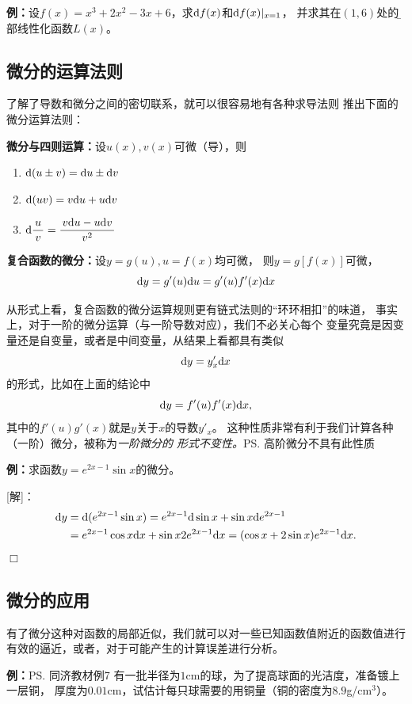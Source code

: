{\bf 例：}设$f(x)=x^3+2x^2-3x+6$，求$\mathrm{d} f(x)$和$\mathrm{d} f(x)|_{x=1}$，
并求其在$(1,6)$处的{\b 局部线性化函数$L(x)$}。

\subsection{微分的运算法则}

了解了导数和微分之间的密切联系，就可以很容易地有各种求导法则
推出下面的微分运算法则：

\begin{thx}
	{\bf 微分与四则运算：}设$u(x),v(x)$可微（导），则
	\begin{enumerate}[(1)]
	  \setlength{\itemindent}{1cm}
	  \item $\mathrm{d} (u\pm v)=\mathrm{d} u\pm \mathrm{d} v$
	  \item $\mathrm{d}(uv)=v\mathrm{d} u+u\mathrm{d} v$
	  \item $\mathrm{d}\displaystyle\frac{\,{u}\,}{\,{v}\,}=\displaystyle\frac{\,{v\mathrm{d} u-u\mathrm{d} v}\,}{\,{v^2}\,}$
	\end{enumerate}
	
	{\bf 复合函数的微分：}设$y=g(u),u=f(x)$均可微，
	则$y=g[f(x)]$可微，
	$$\mathrm{d} y=g'(u)\mathrm{d} u=g'(u)f'(x)\mathrm{d} x$$		
\end{thx}

从形式上看，复合函数的微分运算规则更有链式法则的“环环相扣”的味道，
事实上，对于一阶的微分运算（与一阶导数对应），我们不必关心每个
变量究竟是因变量还是自变量，或者是中间变量，从结果上看都具有类似
$$\mathrm{d} y=y'_x\mathrm{d} x$$
的形式，比如在上面的结论中
$$\mathrm{d} y=f'(u)f'(x)\mathrm{d} x,$$
其中的$f'(u)g'(x)$就是$y$关于$x$的导数$y'_x$。
这种性质非常有利于我们计算各种（一阶）微分，被称为{\it 一阶微分的
形式不变性。}\ps{高阶微分不具有此性质}

{\bf 例：}求函数$y=e^{2x-1}\sin x$的微分。

[解]：
\begin{align*}
	\mathrm{d} y
	&=\mathrm{d}(e^{2x-1}\sin x)
	=e^{2x-1}\mathrm{d}\sin x+\sin x\mathrm{d} e^{2x-1}\\
	&=e^{2x-1}\cos x\mathrm{d} x+\sin x 2e^{2x-1}\mathrm{d} x
	=(\cos x+2\sin x)e^{2x-1}\mathrm{d} x.
\end{align*}
\hfill$\Box$

\subsection{微分的应用}

有了微分这种对函数的局部近似，我们就可以对一些已知函数值附近的函数值进行
有效的逼近，或者，对于可能产生的计算误差进行分析。

{\bf 例：}\ps{同济教材例7}
有一批半径为$1$cm的球，为了提高球面的光洁度，准备镀上一层铜，
厚度为$0.01$cm，试估计每只球需要的用铜量（铜的密度为$8.9$g/cm$^3$）。

